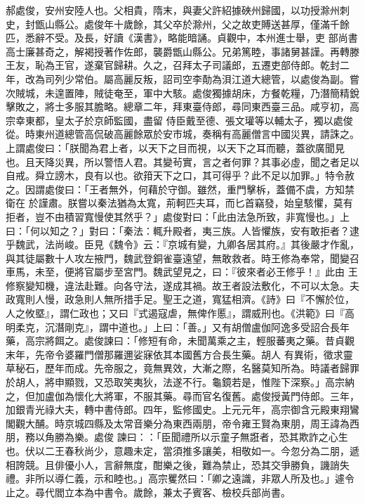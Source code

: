 \begin{pinyinscope}
 郝處俊，安州安陸人也。父相貴，隋末，與妻父許紹據硤州歸國，以功授滁州刺史，封甑山縣公。處俊年十歲餘，其父卒於滁州，父之故吏賻送甚厚，僅滿千餘匹，悉辭不受。及長，好讀《漢書》，略能暗誦。貞觀中，本州進士舉，吏
 部尚書高士廉甚奇之，解褐授著作佐郎，襲爵甑山縣公。兄弟篤睦，事諸舅甚謹。再轉滕王友，恥為王官，遂棄官歸耕。久之，召拜太子司議郎，五遷吏部侍郎。乾封二年，改為司列少常伯。屬高麗反叛，詔司空李勣為浿江道大總管，以處俊為副。嘗次賊城，未遑置陣，賊徒奄至，軍中大駭。處俊獨據胡床，方餐乾糧，乃潛簡精銳擊敗之，將士多服其膽略。總章二年，拜東臺侍郎，尋同東西臺三品。咸亨初，高宗幸東都，皇太子於京師監國，盡留
 侍臣戴至德、張文瓘等以輔太子，獨以處俊從。時東州道總管高侃破高麗餘眾於安市城，奏稱有高麗僧言中國災異，請誅之。上謂處俊曰：「朕聞為君上者，以天下之目而視，以天下之耳而聽，蓋欲廣聞見也。且天降災異，所以警悟人君。其變茍實，言之者何罪？其事必虛，聞之者足以自戒。舜立謗木，良有以也。欲箝天下之口，其可得乎？此不足以加罪。」特令赦之。因謂處俊曰：「王者無外，何藉於守御。雖然，重門擊柝，蓋備不虞，方知禁衛在
 於謹肅。朕嘗以秦法猶為太寬，荊軻匹夫耳，而匕首竊發，始皇駭懼，莫有拒者，豈不由積習寬慢使其然乎？」處俊對曰：「此由法急所致，非寬慢也。」上曰：「何以知之？」對曰：「秦法：輒升殿者，夷三族。人皆懼族，安有敢拒者？逮乎魏武，法尚峻。臣見《魏令》云：『京城有變，九卿各居其府。』其後嚴才作亂，與其徒屬數十人攻左掖門，魏武登銅雀臺遠望，無敢救者。時王修為奉常，聞變召車馬，未至，便將官屬步至宮門。魏武望見之，曰：『彼來者必王修乎！』此由
 王修察變知機，違法赴難。向各守法，遂成其禍。故王者設法敷化，不可以太急。夫政寬則人慢，政急則人無所措手足。聖王之道，寬猛相濟。《詩》曰『不懈於位，人之攸塈』，謂仁政也；又曰『式遏寇虐，無俾作慝』，謂威刑也。《洪範》曰『高明柔克，沉潛剛克』，謂中道也。」上曰：「善。」又有胡僧盧伽阿逸多受詔合長年藥，高宗將餌之。處俊諫曰：「修短有命，未聞萬乘之主，輕服蕃夷之藥。昔貞觀末年，先帝令婆羅門僧那羅邇娑寐依其本國舊方合長生藥。胡人
 有異術，徵求靈草秘石，歷年而成。先帝服之，竟無異效，大漸之際，名醫莫知所為。時議者歸罪於胡人，將申顯戮，又恐取笑夷狄，法遂不行。龜鏡若是，惟陛下深察。」高宗納之，但加盧伽為懷化大將軍，不服其藥。尋而官名復舊。處俊授黃門侍郎。三年，加銀青光祿大夫，轉中書侍郎。四年，監修國史。上元元年，高宗御含元殿東翔鸞閣觀大酺。時京城四縣及太常音樂分為東西兩朋，帝令雍王賢為東朋，周王諱為西朋，務以角勝為樂。處俊
 諫曰：：「臣聞禮所以示童子無誑者，恐其欺詐之心生也。伏以二王春秋尚少，意趣未定，當須推多讓美，相敬如一。今忽分為二朋，遞相誇競。且俳優小人，言辭無度，酣樂之後，難為禁止，恐其交爭勝負，譏誚失禮。非所以導仁義，示和睦也。」高宗矍然曰：「卿之遠識，非眾人所及也。」遽令止之。尋代閻立本為中書令。歲餘，兼太子賓客、檢校兵部尚書。




\end{pinyinscope}
